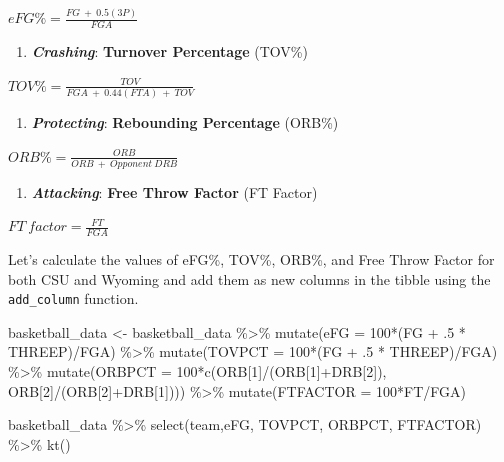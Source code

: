 \documentclass[
  11pt,
]{book}
\newenvironment{Shaded}{\begin{snugshade}}{\end{snugshade}}
\newcommand{\AttributeTok}[1]{\textcolor[rgb]{0.77,0.63,0.00}{#1}}
\newcommand{\DecValTok}[1]{\textcolor[rgb]{0.00,0.00,0.81}{#1}}
\newcommand{\FunctionTok}[1]{\textcolor[rgb]{0.00,0.00,0.00}{#1}}
\newcommand{\NormalTok}[1]{#1}
\newcommand{\OtherTok}[1]{\textcolor[rgb]{0.56,0.35,0.01}{#1}}
\newcommand{\SpecialCharTok}[1]{\textcolor[rgb]{0.00,0.00,0.00}{#1}}
\providecommand{\tightlist}{%
  \setlength{\itemsep}{0pt}\setlength{\parskip}{0pt}}
\theoremstyle{definition}
\theoremstyle{definition}
\theoremstyle{definition}
\theoremstyle{definition}
\theoremstyle{remark}
\begin{document}
\(eFG\% = \frac{FG\ +\ 0.5(3P)}{FGA}\)

\begin{enumerate}
\def\labelenumi{\arabic{enumi}.}
\setcounter{enumi}{1}
\tightlist
\item
  \textbf{\emph{Crashing}}: \textbf{Turnover Percentage} (TOV\%)
\end{enumerate}

\(TOV\% = \frac{TOV}{FGA\ +\ 0.44(FTA)\ +\ TOV}\)

\begin{enumerate}
\def\labelenumi{\arabic{enumi}.}
\setcounter{enumi}{2}
\tightlist
\item
  \textbf{\emph{Protecting}}: \textbf{Rebounding Percentage} (ORB\%)
\end{enumerate}

\(ORB\% = \frac{ORB}{ORB\ +\ Opponent\ DRB}\)

\begin{enumerate}
\def\labelenumi{\arabic{enumi}.}
\setcounter{enumi}{3}
\tightlist
\item
  \textbf{\emph{Attacking}}: \textbf{Free Throw Factor} (FT Factor)
\end{enumerate}

\(FT\ factor = \frac{FT}{FGA}\)

Let's calculate the values of eFG\%, TOV\%, ORB\%, and Free Throw Factor for both CSU and Wyoming and add them as new columns in the tibble using the \texttt{add\_column} function.

\begin{Shaded}
\begin{Highlighting}[]
\NormalTok{basketball\_data }\OtherTok{\textless{}{-}}\NormalTok{ basketball\_data }\SpecialCharTok{\%\textgreater{}\%} 
  \FunctionTok{mutate}\NormalTok{(}\AttributeTok{eFG =} \DecValTok{100}\SpecialCharTok{*}\NormalTok{(FG }\SpecialCharTok{+}\NormalTok{ .}\DecValTok{5} \SpecialCharTok{*}\NormalTok{ THREEP)}\SpecialCharTok{/}\NormalTok{FGA) }\SpecialCharTok{\%\textgreater{}\%}
  \FunctionTok{mutate}\NormalTok{(}\AttributeTok{TOVPCT =} \DecValTok{100}\SpecialCharTok{*}\NormalTok{(FG }\SpecialCharTok{+}\NormalTok{ .}\DecValTok{5} \SpecialCharTok{*}\NormalTok{ THREEP)}\SpecialCharTok{/}\NormalTok{FGA) }\SpecialCharTok{\%\textgreater{}\%}
  \FunctionTok{mutate}\NormalTok{(}\AttributeTok{ORBPCT =} \DecValTok{100}\SpecialCharTok{*}\FunctionTok{c}\NormalTok{(ORB[}\DecValTok{1}\NormalTok{]}\SpecialCharTok{/}\NormalTok{(ORB[}\DecValTok{1}\NormalTok{]}\SpecialCharTok{+}\NormalTok{DRB[}\DecValTok{2}\NormalTok{]), ORB[}\DecValTok{2}\NormalTok{]}\SpecialCharTok{/}\NormalTok{(ORB[}\DecValTok{2}\NormalTok{]}\SpecialCharTok{+}\NormalTok{DRB[}\DecValTok{1}\NormalTok{]))) }\SpecialCharTok{\%\textgreater{}\%}
  \FunctionTok{mutate}\NormalTok{(}\AttributeTok{FTFACTOR =} \DecValTok{100}\SpecialCharTok{*}\NormalTok{FT}\SpecialCharTok{/}\NormalTok{FGA)}

\NormalTok{basketball\_data }\SpecialCharTok{\%\textgreater{}\%} \FunctionTok{select}\NormalTok{(team,eFG, TOVPCT, ORBPCT, FTFACTOR) }\SpecialCharTok{\%\textgreater{}\%} \FunctionTok{kt}\NormalTok{()}
\end{Highlighting}
\end{Shaded}
\end{document}
